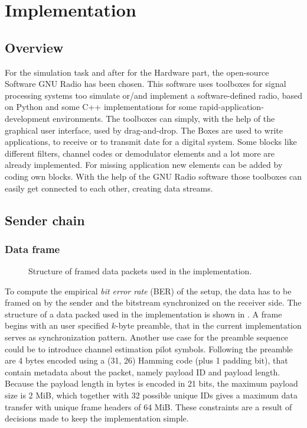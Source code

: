 
\chapter{Implementation}

\section{Overview}

For the simulation task and after for the Hardware part, the open-source Software GNU Radio has been chosen. This software uses toolboxes for signal processing systems too simulate or/and implement a software-defined radio, based on Python and some C++ implementations for some rapid-application-development environments. The toolboxes can simply, with the help of the graphical user interface, used by drag-and-drop. The Boxes are used to write applications, to receive or to transmit date for a digital system. Some blocks like different filters, channel codes or demodulator elements and a lot more are already implemented. For missing application new elements can be added by coding own blocks. With the help of the GNU Radio software those toolboxes can easily get connected to each other, creating data streams. 

\section{Sender chain}
\subsection{Data frame}

\begin{figure}
	\centering
	
	\caption{
		Structure of framed data packets used in the implementation.
		\label{fig:dataframe}
	}
\end{figure}

To compute the empirical \emph{bit error rate} (BER) of the setup, the data has to be framed on by the sender and the bitstream synchronized on the receiver side. The structure of a data packed used in the implementation is shown in . A frame begins with an user specified \(k\)-byte preamble, that in the current implementation serves as synchronization pattern. Another use case for the preamble sequence could be to introduce channel estimation pilot symbols. Following the preamble are 4 bytes encoded using a (31, 26) Hamming code (plus 1 padding bit), that contain metadata about the packet, namely payload ID and payload length. Because the payload length in bytes is encoded in 21 bits, the maximum payload size is 2 MiB, which together with 32 possible unique IDs gives a maximum data transfer with unique frame headers of 64 MiB. These constraints are a result of decisions made to keep the implementation simple.


